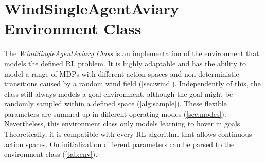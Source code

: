 \section{WindSingleAgentAviary Environment Class} \label{sec:env}
The \emph{WindSingleAgentAviary Class} is an implementation of the environment that models the defined RL problem. 
It is highly adaptable and has the ability to model a range of MDPs with different action spaces and 
non-deterministic transitions caused by a random wind field (\cref{sec:wind}). 
Independently of this, the class still always models a goal environment, 
although the goal might be randomly sampled within a defined space (\cref{alg:sample}). 
These flexible parameters are summed up in different operating modes (\cref{sec:modes}). 
Nevertheless, this environment class only models learning to hover in goals. 
Theoretically, it is compatible with every RL algorithm that allows continuous action spaces.
On initialization different parameters can be parsed to the environment class (\cref{tab:env}).

